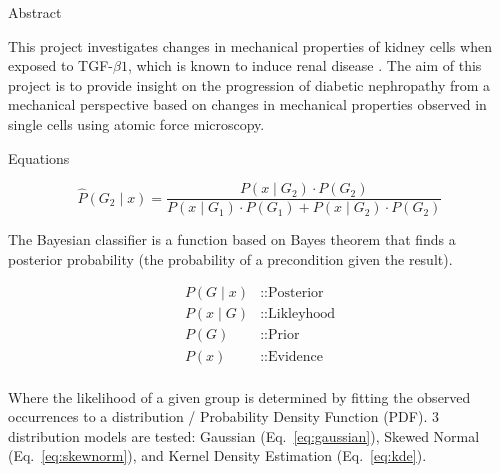 \documentclass[a0paper,portrait]{baposter}
\begin{document}
\begin{poster}

\begin{posterbox}[name=abstract,column=0,row=0]{Abstract}
\begin{justify}
    This project investigates changes in mechanical properties of kidney
    cells when exposed to TGF-\(\beta 1\), which is known to induce
    renal disease \cite{gentleME2013-EpithelialCellTGFv}. The aim of this project is to provide insight
    on the progression of diabetic nephropathy from a mechanical
    perspective based on changes in mechanical properties observed in
    single cells using atomic force microscopy.
\end{justify}
\end{posterbox}

\begin{posterbox}[name=equation,column=0,below=abstract,above=bottom]{Equations}
\begin{small}

\begin{equation}
  \hat{P}(G_2 \mid x) = \frac{P(x \mid G_2) \cdot P(G_2)}{P(x \mid G_1) \cdot P(G_1) + P(x \mid G_2) \cdot P(G_2)}
  \label{eq:classifier}
\end{equation} 

\begin{minipage}[t]{0.575\linewidth}
  \vspace{0pt}
  \begin{description}
    The Bayesian classifier is a function based on Bayes theorem that finds a posterior probability (the probability of a precondition given the result).
  \end{description}
\end{minipage}
\hfill
\begin{minipage}[t]{0.35\linewidth}
  \vspace{-10pt}
  \begin{align*}  
  P(G \mid x) & \text{::Posterior}\\
  P(x \mid G) & \text{::Likleyhood}\\
  P(G)        & \text{::Prior}\\
  P(x)        & \text{::Evidence}\\
  \end{align*}
\end{minipage}

\begin{description}
  Where the likelihood of a given group is determined by fitting the observed occurrences to a distribution / Probability Density Function (PDF). 
  3 distribution models are tested:
  Gaussian (Eq.~\ref{eq:gaussian}),  
  Skewed Normal (Eq.~\ref{eq:skewnorm}), and  
  Kernel Density Estimation (Eq.~\ref{eq:kde}).
\end{description}


\end{small}
\end{posterbox}
\end{poster}
\end{document}
